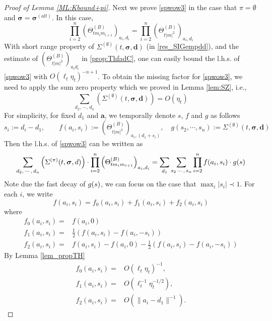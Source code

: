 \documentclass[10pt,reqno]{article}
\theoremstyle{plain} %
\theoremstyle{remark}
\numberwithin{equation}{section}
\begin{document}
\begin{proof}[Proof of Lemma  \ref{ML:Kbound+pi}]
Next we prove \eqref{spwow3}  in the case that $\pi=\emptyset$ and $\boldsymbol{\sigma}=\boldsymbol{\sigma}^{(alt)}$. 
In this case, 
$$
\prod_{i=2}^n \left(\Theta^{(B)}_{tm_im_{i+1}}\right)_{a_i, d_i}
=
\prod_{i=2}^n \left(\Theta^{(B)}_{t|m|^2}\right)_{a_i, d_i} 
$$
With short range property of $\Sigma^{(\emptyset)}(t, \boldsymbol{\sigma}, \textbf{d})$ (in \eqref{res_SIGempdd}), and the estimate of $(\Theta^{(B)}_{t|m|^2})_{a_id_i}$  in \eqref{prop:ThfadC}, one can easily bound the l.h.s. of \eqref{spwow3} with 
$ 
  O (\ell_t\eta_t)^{-n+1} 
$. To obtain the missing factor for \eqref{spwow3}, we need to apply the sum zero property which  we proved in Lemma \ref{lem:SZ}, i.e., 
\begin{equation}\label{SZjadljsk}
   \sum_{d_2,\,\cdots,\,d_n}\left(\Sigma^{(\emptyset)}(t, \boldsymbol{\sigma}, \textbf{d})\right)=O(\eta_t) 
\end{equation}
 For simplicity, for fixed $d_1$ and $\textbf{a}$, we temporally denote $s$, $f$ and $g$ as follows 
$$
s_i:=d_i-d_1,\quad \quad f(a_i, s_i):=\left(\Theta^{(B)}_{t|m|^2}\right)_{a_i,(d_1+s_i)}, \quad g(s_2, \cdots,s_n):=\Sigma^{(\emptyset)}(t, \boldsymbol{\sigma}, \textbf{d})$$
Then the l.h.s. of \eqref{spwow3} can be written as 
\begin{align} \label{Kfadgd}
 \sum_{d_2,\,\cdots,\, d_n}\left(\Sigma^{(\pi)}(t, \boldsymbol{\sigma}, \textbf{d})\right)
\cdot 
\prod_{i=2}^n \left(\Theta^{(B)}_{tm_im_{i+1}}\right)_{a_i, d_i}
=\sum_{d_1}\sum_{s_2\,\cdots,\,s_n} \prod_{i=2}^nf(a_i, s_i)\cdot g(\textbf{\textbf{s}})
\end{align}
Note due the fast decay of $g(\textbf{\textbf{s}})$, we can focus on the case that $\max_i|s_i|\prec 1$. 
For each $i$, we write 
$$
f(a_i, s_i)=f_0(a_i,s_i)+f_1(a_i,s_i )+f_2(a_i,s_i)
$$
where 
\begin{align}
f_0(a_i,s_i)=&f(a_i,0)
\\\nonumber
f_1(a_i,s_i)=&\frac12\left(f(a_i,s_i)-f(a_i, -s_i)\right)  
\\\nonumber
f_2(a_i,s_i)=&f(a_i,s_i)-f(a_i,0)-\frac12\left(f(a_i,s_i)-f(a_i,-s_i)\right)  
\end{align}
By Lemma \ref{lem_propTH}
\begin{align}
f_0(a_i,s_i)=&O(\ell_t\eta_t)^{-1}, 
\\\nonumber
f_1(a_i,s_i)=&O(\ell_t^{-1}\eta_t^{-1/2}),
\\\nonumber
f_2(a_i,s_i)=&O(\|a_i-d_1\|^{-1}) .

\end{align}
\end{proof}
\end{document}
